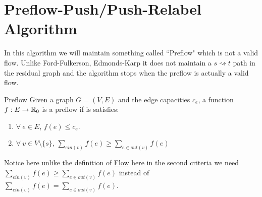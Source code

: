 \section{Preflow-Push/Push-Relabel Algorithm}
In this algorithm we will maintain something called ``Preflow" which is not a valid flow. Unlike Ford-Fulkerson, Edmonds-Karp it does not maintain a $s\rightsquigarrow t$ path in the residual graph and the algorithm stops when the preflow is actually a valid flow.
\begin{Definition}{Preflow}{}
	Given a graph $G=(V,E)$  and the edge capacities $c_e$, a function $f:E\to \mathbb{R}_0$ is a preflow if is satisfies:
	\begin{enumerate}[label=\protect\circled{\arabic*}]
		\item $\forall\ e\in E$, $f(e)\leq c_e$.
		\item $\forall \ v\in V\setminus\{s\}$, $\sum\limits_{e\textit{in}(v)}f(e)\geq \sum\limits_{e\in\textit{out}(v)}f(e)$
	\end{enumerate}
\end{Definition}
Notice here unlike the definition of \hyperref[def:flow]{Flow} here in the second criteria we need  $\sum\limits_{e\textit{in}(v)}f(e)\geq \sum\limits_{e\in\textit{out}(v)}f(e)$ instead of  $\sum\limits_{e\textit{in}(v)}f(e)= \sum\limits_{e\in\textit{out}(v)}f(e)$.

